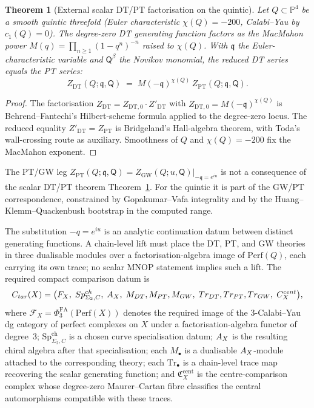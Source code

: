 \documentclass[12pt]{amsart}
\newtheorem{thm}{Theorem}[section]
\theoremstyle{remark}
\providecommand{\PhiFA}{\Phi^{\mathrm{FA}}}
\providecommand{\DT}{\mathrm{DT}}
\providecommand{\PT}{\mathrm{PT}}
\providecommand{\GW}{\mathrm{GW}}
\providecommand{\Perf}{\mathrm{Perf}}
\providecommand{\cF}{\mathcal{F}}
\renewcommand{\P}{\mathbb{P}}
\begin{document}
\begin{thm}[External scalar DT/PT factorisation on the quintic]\label{thm:mnop-quintic}
  Let \(Q\subset\P^4\) be a smooth quintic threefold (Euler
  characteristic \(\chi(Q)=-200\), Calabi--Yau by \(c_1(Q)=0\)).  The
  degree-zero DT generating function factors as the MacMahon power
  \(M(q)=\prod_{n\ge1}(1-q^n)^{-n}\) raised to \(\chi(Q)\).  With
  \(\mathfrak q\) the Euler-characteristic variable and
  \(\mathsf Q^\beta\) the Novikov monomial, the reduced DT series equals
  the PT series:
  \[
    Z_{\DT}(Q;\mathfrak q,\mathsf Q)
    \;=\;
    M(-\mathfrak q)^{\chi(Q)}\,
    Z_{\PT}(Q;\mathfrak q,\mathsf Q).
  \]
\end{thm}

\begin{proof}
  The factorisation \(Z_{\DT}=Z_{\DT,0}\cdot Z'_{\DT}\) with
  \(Z_{\DT,0}=M(-\mathfrak q)^{\chi(Q)}\) is Behrend--Fantechi's Hilbert-scheme
  formula applied to the degree-zero locus.  The reduced equality
  \(Z'_{\DT}=Z_{\PT}\) is Bridgeland's Hall-algebra theorem, with
  Toda's wall-crossing route as auxiliary.  Smoothness of \(Q\) and
  \(\chi(Q)=-200\) fix the MacMahon exponent.
\end{proof}

The PT/GW leg
\(Z_{\PT}(Q;\mathfrak q,\mathsf Q)=
Z_{\GW}(Q;u,\mathsf Q)|_{-\mathfrak q=e^{iu}}\) is not a
consequence of the scalar DT/PT theorem
Theorem~\ref{thm:mnop-quintic}.  For the quintic it is part of the
GW/PT correspondence, constrained by
Gopakumar--Vafa integrality and by the Huang--Klemm--Quackenbush
bootstrap in the computed range.

The substitution \(-q=e^{iu}\) is an analytic continuation datum between
distinct generating functions.  A chain-level lift must place
the DT, PT, and GW theories in three dualisable modules over a
factorisation-algebra image of \(\Perf(Q)\), each carrying its own
trace; no scalar MNOP statement implies such a lift.  The required
compact comparison datum is
\[
  C_{\mathrm{tar}}(X)=
  \bigl(\cF_X,\;\mathrm{Sp}^{\mathrm{ch}}_{\Sigma_2,C},\;
    \cA_X,\; M_{\DT},M_{\PT},M_{\GW},\;
    \mathrm{Tr}_{\DT},\mathrm{Tr}_{\PT},\mathrm{Tr}_{\GW},\;
    \mathfrak C^{\mathrm{cent}}_X\bigr),
\]
where \(\cF_X=\PhiFA_3(\Perf(X))\) denotes the required image of the
3-Calabi--Yau dg category of perfect complexes on \(X\) under a
factorisation-algebra functor of degree~\(3\);
\(\mathrm{Sp}^{\mathrm{ch}}_{\Sigma_2,C}\) is a chosen curve
specialisation datum; \(A_X\) is the resulting chiral algebra after
that specialisation; each \(M_\bullet\) is a dualisable
\(A_X\)-module attached to the corresponding theory; each
\(\mathrm{Tr}_\bullet\) is a chain-level trace map recovering the
scalar generating function; and \(\mathfrak C^{\mathrm{cent}}_X\) is
the centre-comparison complex whose degree-zero Maurer--Cartan fibre
classifies the central automorphisms compatible with these traces.
\end{document}
